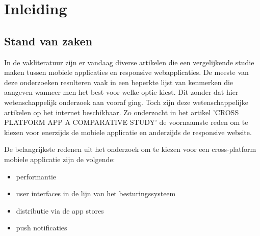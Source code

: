 

\chapter{Inleiding}
\label{ch:inleiding}



\section{Stand van zaken}
\label{sec:stand-van-zaken}

In de vakliteratuur zijn er vandaag diverse artikelen die een vergelijkende studie maken tussen mobiele applicaties
en responsive webapplicaties. De meeste van deze onderzoeken resulteren vaak in een beperkte lijst van kenmerken die aangeven wanneer men het best voor welke optie kiest.
Dit zonder dat hier wetenschappelijk onderzoek aan vooraf ging. Toch zijn deze wetenschappelijke artikelen op het internet beschikbaar. Zo onderzocht \cite{albuquerque2015}
in het artikel 'CROSS PLATFORM APP A COMPARATIVE STUDY' de voornaamste reden om te kiezen voor enerzijds de mobiele
applicatie en anderzijds de responsive website.

De belangrijkste redenen uit het onderzoek om te kiezen voor een cross-platform mobiele applicatie zijn de volgende:
\begin{itemize}
  \item{performantie}
  \item{user interfaces in de lijn van het besturingssysteem}
  \item{distributie via de app stores}
  \item{push notificaties}
\end{itemize}

